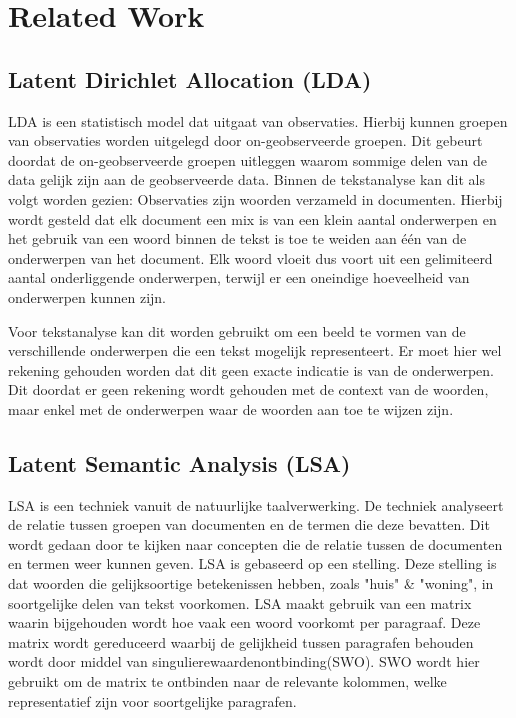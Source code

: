 \section{Related Work}
\label{sec:rel}

\subsection{Latent Dirichlet Allocation (LDA)}
LDA is een statistisch model dat uitgaat van observaties. Hierbij kunnen groepen van observaties worden uitgelegd door on-geobserveerde groepen. Dit gebeurt doordat de on-geobserveerde groepen uitleggen waarom sommige delen van de data gelijk zijn aan de geobserveerde data. Binnen de tekstanalyse kan dit als volgt worden gezien: Observaties zijn woorden verzameld in documenten. Hierbij wordt gesteld dat elk document een mix is van een klein aantal onderwerpen en het gebruik van een woord binnen de tekst is toe te weiden aan één van de onderwerpen van het document. Elk woord vloeit dus voort uit een gelimiteerd aantal onderliggende onderwerpen, terwijl er een oneindige hoeveelheid van onderwerpen kunnen zijn. 

Voor tekstanalyse kan dit worden gebruikt om een beeld te vormen van de verschillende onderwerpen die een tekst mogelijk representeert. Er moet hier wel rekening gehouden worden dat dit geen exacte indicatie is van de onderwerpen. Dit doordat er geen rekening wordt gehouden met de context van de woorden, maar enkel met de onderwerpen waar de woorden aan toe te wijzen zijn. \citep{blei2003latent}

\subsection{Latent Semantic Analysis (LSA)}
LSA is een techniek vanuit de natuurlijke taalverwerking. De techniek analyseert de relatie tussen groepen van documenten en de termen die deze bevatten. Dit wordt gedaan door te kijken naar concepten die de relatie tussen de documenten en termen weer kunnen geven. LSA is gebaseerd op een stelling. Deze stelling is dat woorden die gelijksoortige betekenissen hebben, zoals "huis" \& "woning", in soortgelijke delen van tekst voorkomen. LSA maakt gebruik van een matrix waarin bijgehouden wordt hoe vaak een woord voorkomt per paragraaf. Deze matrix wordt gereduceerd waarbij de gelijkheid tussen paragrafen behouden wordt door middel van singulierewaardenontbinding(SWO). SWO wordt hier gebruikt om de matrix te ontbinden naar de relevante kolommen, welke representatief zijn voor soortgelijke paragrafen. 

